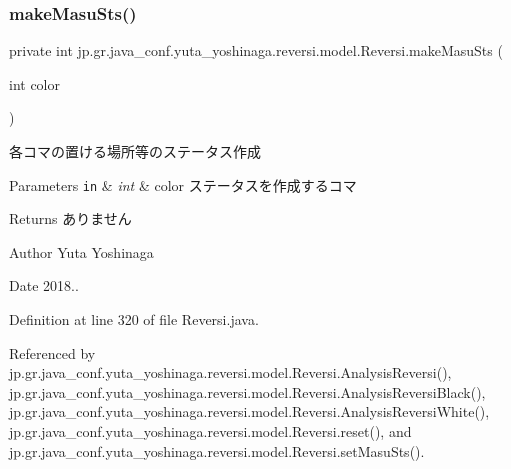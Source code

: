 \subsubsection{\texorpdfstring{make\+Masu\+Sts()}{makeMasuSts()}}
{\footnotesize\ttfamily private int jp.\+gr.\+java\+\_\+conf.\+yuta\+\_\+yoshinaga.\+reversi.\+model.\+Reversi.\+make\+Masu\+Sts (\begin{DoxyParamCaption}\item[{int}]{color }\end{DoxyParamCaption})\hspace{0.3cm}{\ttfamily [private]}}



各コマの置ける場所等のステータス作成 


\begin{DoxyParams}[1]{Parameters}
\mbox{\tt in}  & {\em int} & color ステータスを作成するコマ \\
\hline
\end{DoxyParams}
\begin{DoxyReturn}{Returns}
ありません 
\end{DoxyReturn}
\begin{DoxyAuthor}{Author}
Yuta Yoshinaga 
\end{DoxyAuthor}
\begin{DoxyDate}{Date}
2018.. 
\end{DoxyDate}


Definition at line 320 of file Reversi.\+java.



Referenced by jp.\+gr.\+java\+\_\+conf.\+yuta\+\_\+yoshinaga.\+reversi.\+model.\+Reversi.\+Analysis\+Reversi(), jp.\+gr.\+java\+\_\+conf.\+yuta\+\_\+yoshinaga.\+reversi.\+model.\+Reversi.\+Analysis\+Reversi\+Black(), jp.\+gr.\+java\+\_\+conf.\+yuta\+\_\+yoshinaga.\+reversi.\+model.\+Reversi.\+Analysis\+Reversi\+White(), jp.\+gr.\+java\+\_\+conf.\+yuta\+\_\+yoshinaga.\+reversi.\+model.\+Reversi.\+reset(), and jp.\+gr.\+java\+\_\+conf.\+yuta\+\_\+yoshinaga.\+reversi.\+model.\+Reversi.\+set\+Masu\+Sts().

